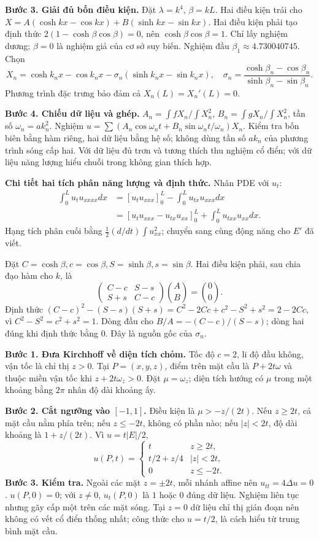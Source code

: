 \textbf{Bước 3. Giải đủ bốn điều kiện.} Đặt $\lambda=k^4$, $\beta=kL$. Hai điều kiện trái cho $X=A(\cosh kx-\cos kx)+B(\sinh kx-\sin kx)$. Hai điều kiện phải tạo định thức $2(1-\cosh\beta\cos\beta)=0$, nên $\cosh\beta\cos\beta=1$. Chỉ lấy nghiệm dương; $\beta=0$ là nghiệm giả của cơ sở suy biến. Nghiệm đầu $\beta_1\approx4.730040745$. Chọn
\[X_n=\cosh k_nx-\cos k_nx-\sigma_n(\sinh k_nx-\sin k_nx),\quad
\sigma_n=\frac{\cosh\beta_n-\cos\beta_n}{\sinh\beta_n-\sin\beta_n}.\]
Phương trình đặc trưng bảo đảm cả $X_n(L)=X_n'(L)=0$.

\textbf{Bước 4. Chiếu dữ liệu và ghép.} $A_n=\int fX_n/\int X_n^2$, $B_n=\int gX_n/\int X_n^2$, tần số $\omega_n=ak_n^2$. Nghiệm $u=\sum(A_n\cos\omega_nt+B_n\sin\omega_nt/\omega_n)X_n$. Kiểm tra bốn biên bằng hàm riêng, hai dữ liệu bằng hệ số; không dùng tần số $ak_n$ của phương trình sóng cấp hai. Với dữ liệu đủ trơn và tương thích thu nghiệm cổ điển; với dữ liệu năng lượng hiểu chuỗi trong không gian thích hợp.

\textbf{Chi tiết hai tích phân năng lượng và định thức.} Nhân PDE với $u_t$:
\[\begin{aligned}
\int_0^Lu_tu_{xxxx}dx
&=[u_tu_{xxx}]_0^L-\int_0^Lu_{tx}u_{xxx}dx\\
&=[u_tu_{xxx}-u_{tx}u_{xx}]_0^L+\int_0^Lu_{txx}u_{xx}dx.
\end{aligned}\]
Hạng tích phân cuối bằng $\frac12(d/dt)\int u_{xx}^2$; chuyển sang cùng động năng cho $E'$ đã viết.

Đặt $C=\cosh\beta,c=\cos\beta,S=\sinh\beta,s=\sin\beta$. Hai điều kiện phải, sau chia đạo hàm cho $k$, là
\[\begin{pmatrix}C-c&S-s\\S+s&C-c\end{pmatrix}\binom AB=\binom00.\]
Định thức $(C-c)^2-(S-s)(S+s)=C^2-2Cc+c^2-S^2+s^2=2-2Cc$, vì $C^2-S^2=c^2+s^2=1$. Dòng đầu cho $B/A=-(C-c)/(S-s)$; dòng hai đúng khi định thức bằng $0$. Đây là nguồn gốc của $\sigma_n$.

\textbf{Bước 1. Đưa Kirchhoff về diện tích chỏm.} Tốc độ $c=2$, li độ đầu không, vận tốc là chỉ thị $z>0$. Tại $P=(x,y,z)$, điểm trên mặt cầu là $P+2t\omega$ và thuộc miền vận tốc khi $z+2t\omega_z>0$. Đặt $\mu=\omega_z$; diện tích hướng có $\mu$ trong một khoảng bằng $2\pi$ nhân độ dài khoảng ấy.

\textbf{Bước 2. Cắt ngưỡng vào $[-1,1]$.} Điều kiện là $\mu>-z/(2t)$. Nếu $z\ge2t$, cả mặt cầu nằm phía trên; nếu $z\le-2t$, không có phần nào; nếu $|z|<2t$, độ dài khoảng là $1+z/(2t)$. Vì $u=t|E|/2$,
\[u(P,t)=\begin{cases}t&z\ge2t,\\t/2+z/4&|z|<2t,\\0&z\le-2t.\end{cases}\]
\textbf{Bước 3. Kiểm tra.} Ngoài các mặt $z=\pm2t$, mỗi nhánh affine nên $u_{tt}=4\Delta u=0$. $u(P,0)=0$; với $z\ne0$, $u_t(P,0)$ là $1$ hoặc $0$ đúng dữ liệu. Nghiệm liên tục nhưng gãy cấp một trên các mặt sóng. Tại $z=0$ dữ liệu chỉ thị gián đoạn nên không có vết cổ điển thống nhất; công thức cho $u=t/2$, là cách hiểu từ trung bình mặt cầu.

